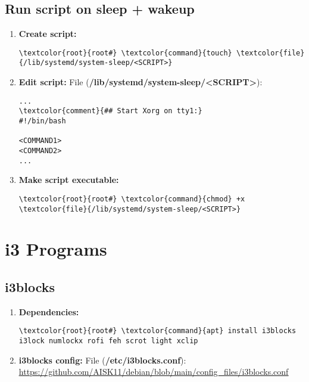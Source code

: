 \documentclass[10pt, a4paper, onecolumn, openany]{book} %
\begin{document}
\section{Run script on sleep + wakeup}
\begin{enumerate}
    \item \textbf{Create script:}
\begin{Verbatim}[commandchars=\\\{\}]
\textcolor{root}{root#} \textcolor{command}{touch} \textcolor{file}{/lib/systemd/system-sleep/<SCRIPT>}
\end{Verbatim}
    \item \textbf{Edit script:}
\newline File (\textbf{\textcolor{file}{/lib/systemd/system-sleep/<SCRIPT>}}):
\begin{Verbatim}[commandchars=\\\{\}]
...
\textcolor{comment}{## Start Xorg on tty1:}
#!/bin/bash

<COMMAND1>
<COMMAND2>
...
\end{Verbatim}
    \item \textbf{Make script executable:}
\begin{Verbatim}[commandchars=\\\{\}]
\textcolor{root}{root#} \textcolor{command}{chmod} +x \textcolor{file}{/lib/systemd/system-sleep/<SCRIPT>}
\end{Verbatim}    
\end{enumerate}
\chapter{i3 Programs}
\section{i3blocks}
\begin{enumerate}
    \item \textbf{Dependencies:}
\begin{Verbatim}[commandchars=\\\{\}]
\textcolor{root}{root#} \textcolor{command}{apt} install i3blocks i3lock numlockx rofi feh scrot light xclip
\end{Verbatim}
    \item \textbf{i3blocks config:}
\newline File (\textbf{\textcolor{file}{/etc/i3blocks.conf}}):
\newline \underline{\url{https://github.com/AISK11/debian/blob/main/config_files/i3blocks.conf}}
\end{enumerate}
\end{document}
